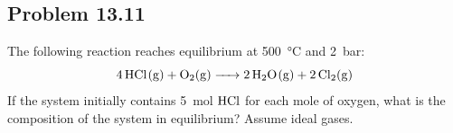 

\subsection*{Problem 13.11}
The following reaction reaches equilibrium at
500~\unit{\degreeCelsius} and 2~\unit{\bar}:
\begin{equation*}
  \ce{4HCl(g) + O2(g) -> 2H2O(g) + 2Cl2(g)}
\end{equation*}
If the system initially contains 5~\unit{\mole} \(\ce{HCl}\) for each
mole of oxygen, what is the composition of the system in equilibrium?
Assume ideal gases.

